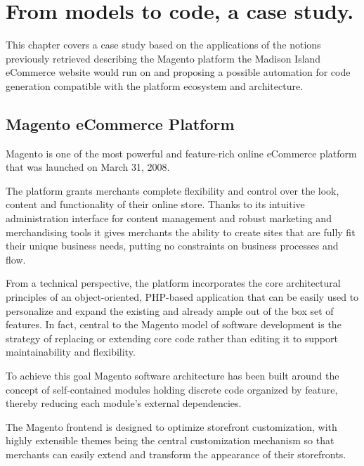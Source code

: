\chead{}

\chapter{From models to code, a case study.}

This chapter covers a case study based on the applications of the notions previously retrieved describing the Magento platform the Madison Island eCommerce website would run on and proposing a possible automation for code generation compatible with the platform ecosystem and architecture.

\section{Magento eCommerce Platform}

Magento is one of the most powerful and feature-rich online eCommerce platform that was launched on March 31, 2008. 

The platform grants merchants complete flexibility and control over the look, content and functionality of their online store. Thanks to its intuitive administration interface for content management and robust marketing and merchandising tools it gives merchants the ability to create sites that are fully fit their unique business needs, putting no constraints on business processes and flow.

From a technical perspective, the platform incorporates the core architectural principles of an object-oriented, PHP-based application that can be easily used to personalize and expand the existing and already ample out of the box set of features.
In fact, central to the Magento model of software development is the strategy of replacing or extending core code rather than editing it to support maintainability and flexibility. 

To achieve this goal Magento software architecture has been built around the concept of self-contained modules holding discrete code organized by feature, thereby reducing each module’s external dependencies.

The Magento frontend is designed to optimize storefront customization, with highly extensible themes being the central customization mechanism so that merchants can easily extend and transform the appearance of their storefronts.



